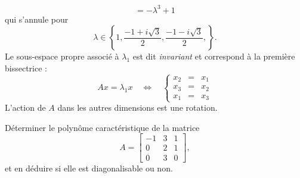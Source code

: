 \begin{enumerate}
$$ = -\lambda^3 + 1
 $$
 qui s'annule pour 
 $$
 \lambda \in \left\{1, \frac{-1+i\sqrt{3}}{2}, \frac{-1-i\sqrt{3}}{2}, \right\}.
 $$
 Le sous-espace propre associé à $\lambda_1$ est dit {\em invariant} et correspond à la première bissectrice : 
 $$
 A x = \lambda_1 x \quad \Leftrightarrow \quad 
 \left\{\begin{array}{rcl} x_2 & = & x_1 \\ x_3 & = & x_2 \\ x_1 & = & x_3 \end{array} \right.
 $$
 L'action de $A$ dans les autres dimensions est une rotation.
\end{enumerate}


\begin{exercise*}
  Déterminer le polynôme caractéristique de la matrice
  $$
  A = \left[\begin{array}{rrr}
  -1 & 3 & 1 \\ 0 & 2 & 1 \\ 0 & 3 & 0
  \end{array}\right], 
  $$
  et en déduire si elle est diagonalisable ou non.
\end{exercise*}

